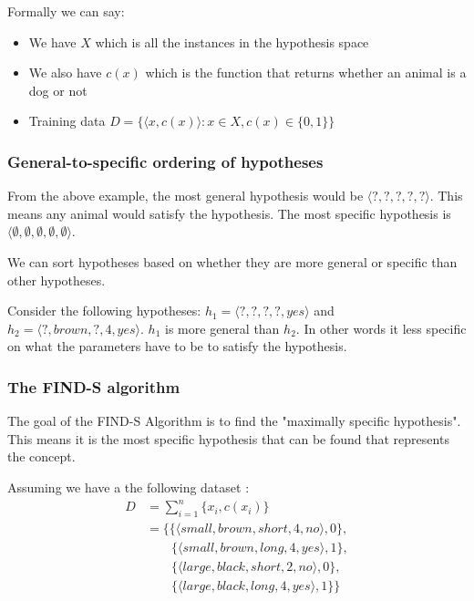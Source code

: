 \documentclass[10pt,a4paper]{article}
\begin{document}
Formally we can say:

\begin{itemize}
\item We have $X$ which is all the instances in the hypothesis space
\item We also have $c(x)$ which is the function that returns whether an animal is a dog or not
\item Training data $ D = \{ \langle x,c(x) \rangle : x \in X, c(x) \in \{0,1\}\}$
\end{itemize}

\citep{stan}

\subsubsection{General-to-specific ordering of hypotheses}

From the above example, the most general hypothesis would be $\langle?,?,?,?,?\rangle$. This means any animal would satisfy the hypothesis. The most specific hypothesis is $\langle\emptyset,\emptyset,\emptyset,\emptyset,\emptyset\rangle$. 

We can sort hypotheses based on whether they are more general or specific than other hypotheses.

Consider the following hypotheses: $h_1 = \langle?,?,?,?,yes\rangle$ and $h_2 = \langle?,brown,?,4,yes\rangle$. $h_1$ is more general than $h_2$. In other words it less specific on what the parameters have to be to satisfy the hypothesis. 

\citep{Riedmiller}
\subsubsection{The FIND-S algorithm }
The goal of the FIND-S Algorithm is to find the "maximally specific hypothesis". This means it is the most specific hypothesis that can be found that represents the concept.

Assuming we have a the following dataset : 
\begin{equation}
\label{dataset}
\begin{split}
D &= \sum_{i=1}^n\{x_i,c(x_i)\}\\ 
  &= \{        \{\langle small, brown, short, 4, no\rangle, 0\},\\
  & \quad\quad \{\langle small, brown, long, 4, yes\rangle, 1\},\\
  & \quad\quad \{\langle large, black, short, 2, no\rangle, 0\},\\
  & \quad\quad \{\langle large, black, long, 4, yes\rangle, 1\}
     \}
\end{split}
\end{equation} 
\end{document}
